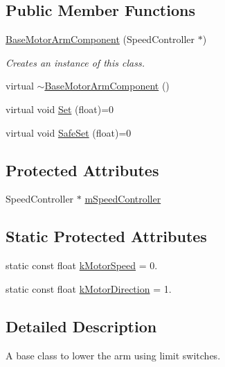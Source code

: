 \subsection*{\-Public \-Member \-Functions}
\begin{DoxyCompactItemize}
\item 
\hyperlink{class_base_motor_arm_component_a4989002402011f28bb27a5d9dbe43529}{\-Base\-Motor\-Arm\-Component} (\-Speed\-Controller $\ast$)
\begin{DoxyCompactList}\small\item\em \-Creates an instance of this class. \end{DoxyCompactList}\item 
virtual \hyperlink{class_base_motor_arm_component_a728e1d4d38f7607fc96fd7db241d15cd}{$\sim$\-Base\-Motor\-Arm\-Component} ()
\item 
virtual void \hyperlink{class_base_motor_arm_component_af2ad1b40c5e0e55a694bb19cfe98c691}{\-Set} (float)=0
\item 
virtual void \hyperlink{class_base_motor_arm_component_a610812468e127706b11aabc97155c4c0}{\-Safe\-Set} (float)=0
\end{DoxyCompactItemize}
\subsection*{\-Protected \-Attributes}
\begin{DoxyCompactItemize}
\item 
\-Speed\-Controller $\ast$ \hyperlink{class_base_motor_arm_component_ad928d86f5eb38d02f43a65e0491dcad8}{m\-Speed\-Controller}
\end{DoxyCompactItemize}
\subsection*{\-Static \-Protected \-Attributes}
\begin{DoxyCompactItemize}
\item 
static const float \hyperlink{class_base_motor_arm_component_ad8633011d5b9b10ca813a8504f38e74c}{k\-Motor\-Speed} = 0.
\item 
static const float \hyperlink{class_base_motor_arm_component_a93cac72cee3f552037027ab847372f12}{k\-Motor\-Direction} = 1.
\end{DoxyCompactItemize}


\subsection{\-Detailed \-Description}
\-A base class to lower the arm using limit switches. 

